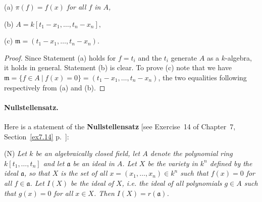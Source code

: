 \documentclass[12pt,letterpaper]{article}%
\newcommand{\mf}{\mathfrak}
\newcommand{\aaa}{\mf a}
\newcommand{\mmm}{\mf m}
\newcommand{\nn}{\noindent}
\begin{document}
(a) $\pi(f)=f(x)$ \emph{for all $f$ in $A$,}

(b) $A=k[t_1-x_1,\dots,t_n-x_n],$

(c) $\mmm=(t_1-x_1,\dots,t_n-x_n)$.

\begin{proof} 
Since Statement (a) holds for $f=t_i$ and the $t_i$ generate $A$ as a $k$-algebra, it holds in general. Statement (b) is clear. To prove (c) note that we have $\mmm=\{f\in A\ |\ f(x)=0\}=(t_1-x_1,\dots,t_n-x_n)$, the two equalities following respectively from (a) and (b).
\end{proof}

\paragraph{Nullstellensatz.}\label{null}%

Here is a statement of the \textbf{Nullstellensatz} [see Exercise~14 of Chapter~7, Section~\ref{ex7.14} p.~\pageref{ex7.14}]:

\nn(N) \emph{Let $k$ be an algebraically closed field, let $A$ denote the polynomial ring $k[t_1,\dots,t_n]$ and let $\aaa$ be an ideal in $A$. Let $X$ be the variety in $k^n$ defined by the ideal $\aaa$, so that $X$ is the set of all $x=(x_1,\dots,x_n)\in k^n$ such that $f(x)=0$ for all $f\in\aaa$. Let $I(X)$ be the ideal of $X$, i.e. the ideal of all polynomials $g\in A$ such that $g(x)=0$ for all $x\in X$. Then $I(X)=r(\aaa)$.}
\end{document}
